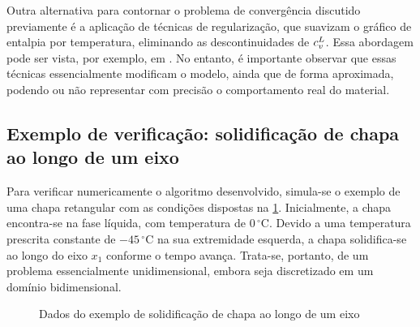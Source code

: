 \documentclass[Tese.tex]{subfiles}
\begin{document}
Outra alternativa para contornar o problema de convergência discutido previamente é a aplicação de técnicas de regularização, que suavizam o gráfico de entalpia por temperatura, eliminando as descontinuidades de $c_v^L$. Essa abordagem pode ser vista, por exemplo, em . No entanto, é importante observar que essas técnicas essencialmente modificam o modelo, ainda que de forma aproximada, podendo ou não representar com precisão o comportamento real do material.




\subsection{Exemplo de verificação: solidificação de chapa ao longo de um eixo}

Para verificar numericamente o algoritmo desenvolvido, simula-se o exemplo de uma chapa retangular com as condições dispostas na \cref{fig:PhaseChange0}. Inicialmente, a chapa encontra-se na fase líquida, com temperatura de $0\,^{\circ}$C. Devido a uma temperatura prescrita constante de $-45\,^{\circ}$C na sua extremidade esquerda, a chapa solidifica-se ao longo do eixo $x_1$ conforme o tempo avança. Trata-se, portanto, de um problema essencialmente unidimensional, embora seja discretizado em um domínio bidimensional.

\begin{figure}[!htb]
	\centering
	\caption{Dados do exemplo de solidificação de chapa ao longo de um eixo}
	\label{fig:PhaseChange0}
	{\small
		\noindent{}
	}	
\end{figure}
\end{document}
